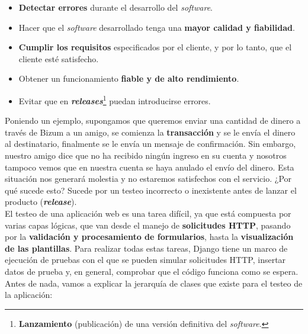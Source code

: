     \begin{itemize}
        \item \textbf{Detectar errores} durante el desarrollo del \textit{software}.
        \item Hacer que el \textit{software} desarrollado tenga una \textbf{mayor calidad y
        fiabilidad}.
        \item \textbf{Cumplir los requisitos} especificados por el cliente, y por lo tanto,
        que el cliente esté satisfecho.
        \item Obtener un funcionamiento \textbf{fiable y de alto rendimiento}.
        \item Evitar que en \textbf{\textit{releases}}\footnote{\textbf{Lanzamiento}
        (publicación) de una versión definitiva del \textit{software}.} puedan introducirse
        errores.
    \end{itemize}

Poniendo un ejemplo, supongamos que queremos enviar una cantidad de dinero a través de
Bizum a un amigo, se comienza la \textbf{transacción} y se le envía el dinero al
destinatario, finalmente se le envía un mensaje de confirmación. Sin embargo, nuestro amigo
dice que no ha recibido ningún ingreso en su cuenta y nosotros tampoco vemos que en nuestra
cuenta se haya anulado el envío del dinero. Esta situación nos generará molestia y no
estaremos satisfechos con el servicio. ¿Por qué sucede esto? Sucede por un testeo
incorrecto o inexistente antes de lanzar el producto (\textbf{\textit{release}}).\\

El testeo de una aplicación web es una tarea difícil, ya que está compuesta por varias
capas lógicas, que van desde el manejo de \textbf{solicitudes HTTP}, pasando por la
\textbf{validación y procesamiento de formularios}, hasta la \textbf{visualización de las
plantillas}. Para realizar todas estas tareas, Django tiene un marco de ejecución de
pruebas con el que se pueden simular solicitudes HTTP, insertar datos de prueba y, en
general, comprobar que el código funciona como se espera.\\

Antes de nada, vamos a explicar la jerarquía de clases que existe para el testeo de la
aplicación:

